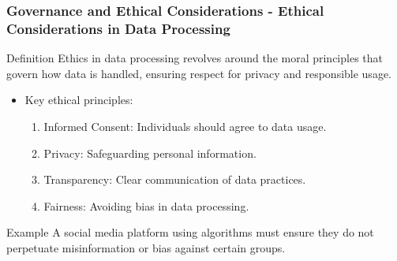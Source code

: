 \documentclass{beamer}
\begin{document}
\begin{frame}[fragile]
    \frametitle{Governance and Ethical Considerations - Ethical Considerations in Data Processing}
    \begin{block}{Definition}
        Ethics in data processing revolves around the moral principles that govern how data is handled, ensuring respect for privacy and responsible usage.
    \end{block}

    \begin{itemize}
        \item Key ethical principles:
        \begin{enumerate}
            \item Informed Consent: Individuals should agree to data usage.
            \item Privacy: Safeguarding personal information.
            \item Transparency: Clear communication of data practices.
            \item Fairness: Avoiding bias in data processing.
        \end{enumerate}
    \end{itemize}

    \begin{block}{Example}
        A social media platform using algorithms must ensure they do not perpetuate misinformation or bias against certain groups.
    \end{block}
\end{frame}
\end{document}
